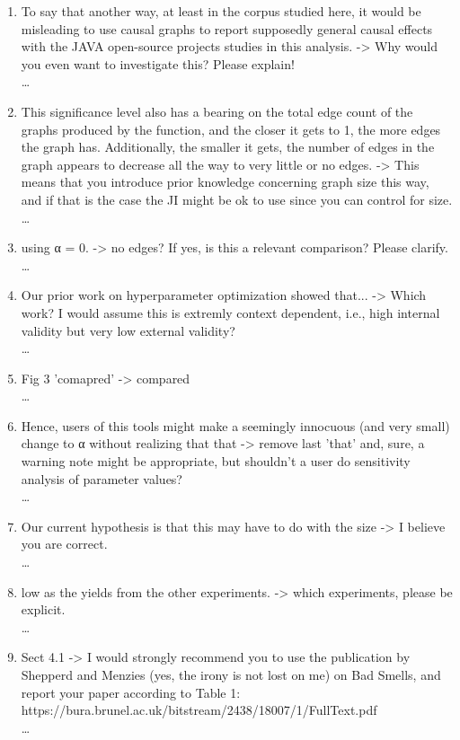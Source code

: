 \documentclass[]{svjour3}
\begin{document}
\begin{enumerate}
\begin{enumerate}
    \item To say that another way, at least in the corpus studied here, it would be misleading to use causal graphs to report supposedly general causal effects with the JAVA open-source projects studies in this analysis. -> Why would you even want to investigate this? Please explain!\\{\MARK \dots}
    \item This significance level also has a bearing on the total edge count of the graphs produced by the function, and the closer it gets to 1, the more edges the graph has. Additionally, the smaller it gets, the number of edges in the graph appears to decrease all the way to very little or no edges. -> This means that you introduce prior knowledge concerning graph size this way, and if that is the case the JI might be ok to use since you can control for size.\\{\MARK \dots}
    \item using α = 0. -> no edges? If yes, is this a relevant comparison? Please clarify.\\{\MARK \dots}
    \item Our prior work on hyperparameter optimization showed that... -> Which work? I would assume this is extremly context dependent, i.e., high internal validity but very low external validity?\\{\MARK \dots}
    \item Fig 3 'comapred' -> compared\\{\MARK \dots}
    \item Hence, users of this tools might make a seemingly innocuous (and very small) change to α without realizing that that -> remove last 'that' and, sure, a warning note might be appropriate, but shouldn't a user do sensitivity analysis of parameter values?\\{\MARK \dots}
    \item  Our current hypothesis is that this may have to do with the size -> I believe you are correct.\\{\MARK \dots}
    \item  low as the yields from the other experiments. -> which experiments, please be explicit.\\{\MARK \dots}
    \item Sect 4.1 -> I would strongly recommend you to use the publication by Shepperd and Menzies (yes, the irony is not lost on me) on Bad Smells, and report your paper according to Table 1: https://bura.brunel.ac.uk/bitstream/2438/18007/1/FullText.pdf\\{\MARK \dots}

\end{enumerate}
\end{enumerate}
\end{document}
